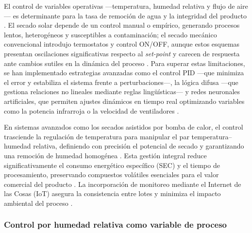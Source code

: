 El control de variables operativas —temperatura, humedad relativa y flujo de aire— 
es determinante para la tasa de remoción de agua y la integridad del producto 
\parencite{abreu_influence_2025, arifin_controlling_2024}. El secado solar depende 
de un control manual o empírico, generando procesos lentos, heterogéneos y 
susceptibles a contaminación; el secado mecánico convencional introdujo termostatos 
y control ON/OFF, aunque estos esquemas presentan oscilaciones significativas 
respecto al \textit{set-point} y carecen de respuesta ante cambios sutiles en la 
dinámica del proceso \parencite{abreu_influence_2025, arifin_controlling_2024, 
p_romero_leiton_mathematical_2025, bustos-vanegas_numerical_2022, 
cruz-ospina_improving_2026}. Para superar estas limitaciones, se han implementado 
estrategias avanzadas como el control PID —que minimiza el error y estabiliza el 
sistema frente a perturbaciones—, la lógica difusa —que gestiona relaciones no 
lineales mediante reglas lingüísticas— y redes neuronales artificiales, que permiten 
ajustes dinámicos en tiempo real optimizando variables como la potencia infrarroja 
o la velocidad de ventiladores \parencite{arifin_controlling_2024, yu_current_2025, 
gradov_modelling_2022, nafisah_implementation_2024, el-mesery_application_2025-1}.

En sistemas avanzados como los secados asistidos por bomba de calor, el control 
trasciende la regulación de temperatura para manipular el par 
temperatura--humedad relativa, definiendo con precisión el potencial de secado y 
garantizando una remoción de humedad homogénea \parencite{amaral_simulation_2018, 
bustos-vanegas_numerical_2022, gomez-daza_innovacion_2023}. Esta gestión integral 
reduce significativamente el consumo energético específico (SEC) y el tiempo de 
procesamiento, preservando compuestos volátiles esenciales para el valor comercial 
del producto \parencite{abbaspour-gilandeh_effect_2021, arifin_controlling_2024, 
cruz-ospina_improving_2026}. La incorporación de monitoreo mediante el Internet de 
las Cosas (IoT) asegura la consistencia entre lotes y minimiza el impacto ambiental 
del proceso \parencite{yu_current_2025, p_romero_leiton_mathematical_2025}.

\subsubsection{Control por humedad relativa como variable de proceso}

